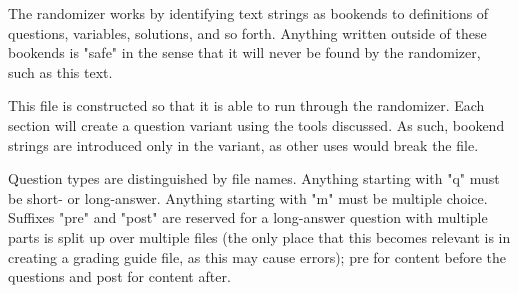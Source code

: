 












The randomizer works by identifying text strings as bookends to definitions of questions, variables, solutions, and so forth. Anything written outside of these bookends is "safe" in the sense that it will never be found by the randomizer, such as this text.

This file is constructed so that it is able to run through the randomizer. Each section will create a question variant using the tools discussed. As such, bookend strings are introduced only in the variant, as other uses would break the file.

Question types are distinguished by file names. Anything starting with "q" must be short- or long-answer. Anything starting with "m" must be multiple choice. Suffixes "pre" and "post" are reserved for a long-answer question with multiple parts is split up over multiple files (the only place that this becomes relevant is in creating a grading guide file, as this may cause errors); pre for content before the questions and post for content after.



